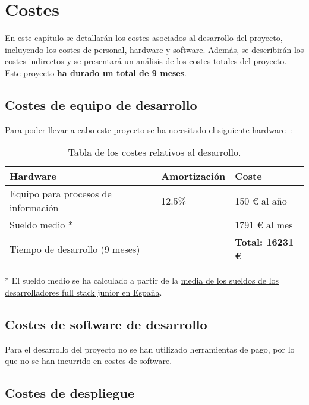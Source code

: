 \chapter{Costes}

En este capítulo se detallarán los costes asociados al desarrollo del proyecto, incluyendo los costes de personal, hardware y software. Además, se describirán los costes indirectos y se presentará un análisis de los costes totales del proyecto. Este proyecto \textbf{ha durado un total de 9 meses}.

\section{Costes de equipo de desarrollo}

Para poder llevar a cabo este proyecto se ha necesitado el siguiente hardware~\cite{agencia2023manual}:

\begin{table}[H]
  \centering
  \begin{tabular}{|l|l|l|}
    \hline
    \textbf{Hardware}               & \textbf{Amortización} & \textbf{Coste}          \\ \hline
    Equipo para procesos de información & 12.5\%            & 150 € al año            \\ \hline
    Sueldo medio *                  &                       & 1791 € al mes           \\ \hline
    Tiempo de desarrollo (9 meses)  &                       & \textbf{Total: 16231 €} \\ \hline
  \end{tabular}
  \caption{Tabla de los costes relativos al desarrollo.}
  \label{table:1}
\end{table}

* El sueldo medio se ha calculado a partir de la \href{https://www.glassdoor.es/Sueldos/desarrollador-full-stack-junior-sueldo-SRCH_KO0,31.htm}{media de los sueldos de los desarrolladores full stack junior en España}.

\section{Costes de software de desarrollo}

Para el desarrollo del proyecto no se han utilizado herramientas de pago, por lo que no se han incurrido en costes de software.

\section{Costes de despliegue}

